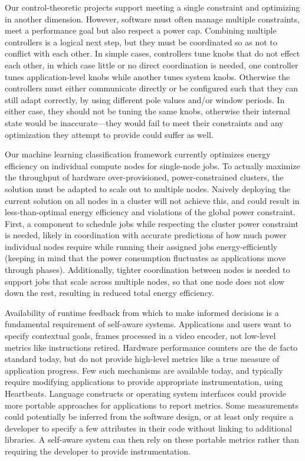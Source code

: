 Our control-theoretic projects support meeting a single constraint and optimizing in another dimension.
However, software must often manage multiple constraints, \eg meet a performance goal but also respect a power cap.
Combining multiple controllers is a logical next step, but they must be coordinated so as not to conflict with each other.
In simple cases, controllers tune knobs that do not effect each other, in which case little or no direct coordination is needed, \eg one controller tunes application-level knobs while another tunes system knobs.
Otherwise the controllers must either communicate directly or be configured such that they can still adapt correctly, \eg by using different pole values and/or window periods.
In either case, they should not be tuning the same knobs, otherwise their internal state would be inaccurate---they would fail to meet their constraints and any optimization they attempt to provide could suffer as well.

Our machine learning classification framework currently optimizes energy efficiency on individual compute nodes for single-node jobs.
To actually maximize the throughput of hardware over-provisioned, power-constrained clusters, the solution must be adapted to scale out to multiple nodes.
Naively deploying the current solution on all nodes in a cluster will not achieve this, and could result in less-than-optimal energy efficiency and violations of the global power constraint.
First, a component to schedule jobs while respecting the cluster power constraint is needed, likely in coordination with accurate predictions of how much power individual nodes require while running their assigned jobs energy-efficiently (keeping in mind that the power consumption fluctuates as applications move through phases).
Additionally, tighter coordination between nodes is needed to support jobs that scale across multiple nodes, so that one node does not slow down the rest, resulting in reduced total energy efficiency.

Availability of runtime feedback from which to make informed decisions is a fundamental requirement of self-aware systems.
Applications and users want to specify contextual goals, \eg frames processed in a video encoder, not low-level metrics like instructions retired.
Hardware performance counters are the de facto standard today, but do not provide high-level metrics like a true measure of application progress.
Few such mechanisms are available today, and typically require modifying applications to provide appropriate instrumentation, \eg using Heartbeats.
Language constructs or operating system interfaces could provide more portable approaches for applications to report metrics.
Some measurements could potentially be inferred from the software design, or at least only require a developer to specify a few attributes in their code without linking to additional libraries.
A self-aware system can then rely on these portable metrics rather than requiring the developer to provide instrumentation.
